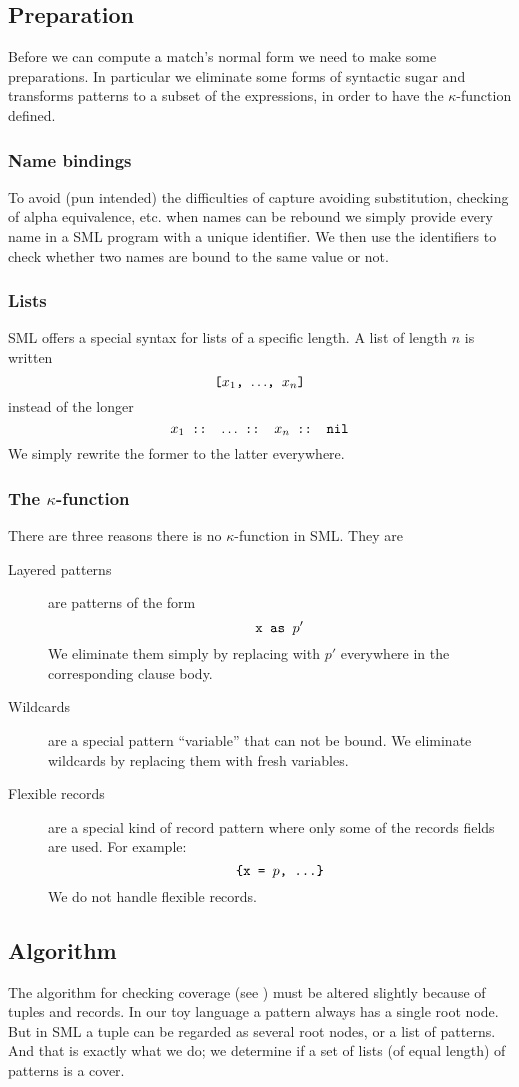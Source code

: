 \subsection{Preparation}\label{sec:preparation}
Before we can compute a match's normal form we need to make some
preparations. In particular we eliminate some forms of syntactic sugar and
transforms patterns to a subset of the expressions, in order to have the
$\kappa$-function defined.

\subsubsection{Name bindings}
To avoid (pun intended) the difficulties of capture avoiding substitution, checking
of alpha equivalence, etc. when names can be rebound we simply provide every
name in a SML program with a unique identifier. We then use the identifiers to
check whether two names are bound to the same value or not.

\subsubsection{Lists}
SML offers a special syntax for lists of a specific length. A list of length $n$
is written
\[
\texttt{[$x_1$, $\ldots$, $x_n$]}
\]
instead of the longer
\[
\texttt{$x_1$ :: $\ldots$ :: $x_n$ :: nil}
\]
We simply rewrite the former to the latter everywhere.

\subsubsection{The $\kappa$-function}
There are three reasons there is no $\kappa$-function in SML. They are
\begin{description}
\item[Layered patterns] are patterns of the form
  \[
  \texttt{x as $p'$}
  \]
  We eliminate them simply by replacing  with $p'$ everywhere in the
  corresponding clause body.
\item[Wildcards] are a special pattern ``variable'' that can not be bound. We
  eliminate wildcards by replacing them with fresh variables.
\item[Flexible records] are a special kind of record pattern where only some of
  the records fields are used. For example:
  \[
  \texttt{\{x = $p$, ...\}}
  \]
  We do not handle flexible records.
\end{description}

\subsection{Algorithm}\label{sec:algorithm}
The algorithm for checking coverage (see ) must be altered
slightly because of tuples and records. In our toy language a pattern always has
a single root node. But in SML a tuple can be regarded as several root nodes, or
a list of patterns. And that is exactly what we do; we determine if a set of
lists (of equal length) of patterns is a cover.


